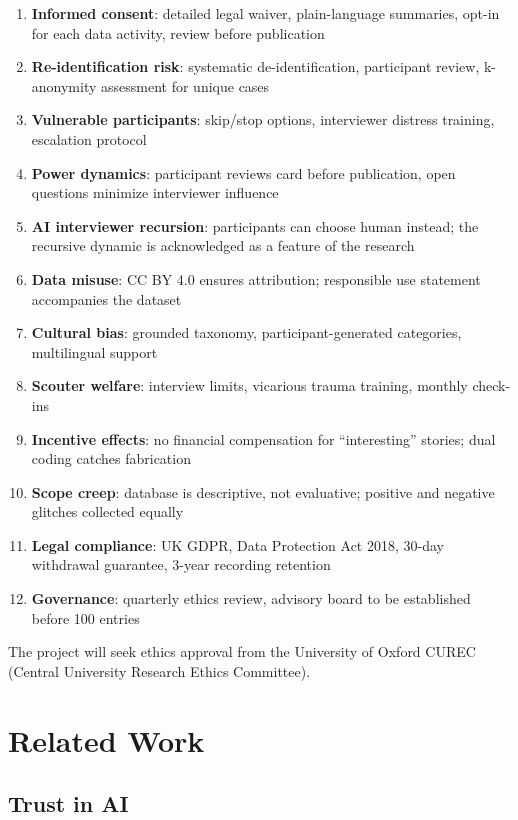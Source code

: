 \documentclass[11pt,a4paper]{article}
\begin{document}
\begin{enumerate}[noitemsep]
    \item \textbf{Informed consent}: detailed legal waiver, plain-language summaries, opt-in for each data activity, review before publication
    \item \textbf{Re-identification risk}: systematic de-identification, participant review, k-anonymity assessment for unique cases
    \item \textbf{Vulnerable participants}: skip/stop options, interviewer distress training, escalation protocol
    \item \textbf{Power dynamics}: participant reviews card before publication, open questions minimize interviewer influence
    \item \textbf{AI interviewer recursion}: participants can choose human instead; the recursive dynamic is acknowledged as a feature of the research
    \item \textbf{Data misuse}: CC BY 4.0 ensures attribution; responsible use statement accompanies the dataset
    \item \textbf{Cultural bias}: grounded taxonomy, participant-generated categories, multilingual support
    \item \textbf{Scouter welfare}: interview limits, vicarious trauma training, monthly check-ins
    \item \textbf{Incentive effects}: no financial compensation for ``interesting'' stories; dual coding catches fabrication
    \item \textbf{Scope creep}: database is descriptive, not evaluative; positive and negative glitches collected equally
    \item \textbf{Legal compliance}: UK GDPR, Data Protection Act 2018, 30-day withdrawal guarantee, 3-year recording retention
    \item \textbf{Governance}: quarterly ethics review, advisory board to be established before 100 entries
\end{enumerate}

The project will seek ethics approval from the University of Oxford CUREC (Central University Research Ethics Committee).

\section{Related Work}

\subsection{Trust in AI}
\end{document}
